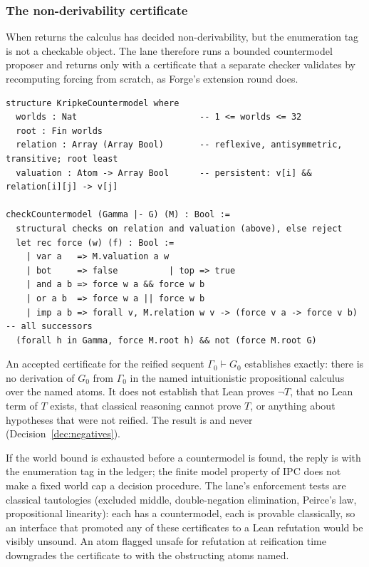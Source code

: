 \subsubsection{The non-derivability certificate}

When  returns  the calculus has decided non-derivability, but the enumeration tag is not a checkable object. The lane therefore runs a bounded countermodel proposer and returns  only with a certificate that a separate checker validates by recomputing forcing from scratch, as Forge's extension round does\cite{forge}.
\begin{lstlisting}
structure KripkeCountermodel where
  worlds : Nat                        -- 1 <= worlds <= 32
  root : Fin worlds
  relation : Array (Array Bool)       -- reflexive, antisymmetric, transitive; root least
  valuation : Atom -> Array Bool      -- persistent: v[i] && relation[i][j] -> v[j]

checkCountermodel (Gamma |- G) (M) : Bool :=
  structural checks on relation and valuation (above), else reject
  let rec force (w) (f) : Bool :=
    | var a   => M.valuation a w
    | bot     => false          | top => true
    | and a b => force w a && force w b
    | or a b  => force w a || force w b
    | imp a b => forall v, M.relation w v -> (force v a -> force v b)   -- all successors
  (forall h in Gamma, force M.root h) && not (force M.root G)
\end{lstlisting}

\begin{definition}
An accepted certificate for the reified sequent $\Gamma_0 \vdash G_0$ establishes exactly: there is no derivation of $G_0$ from $\Gamma_0$ in the named intuitionistic propositional calculus over the named atoms. It does not establish that Lean proves $\neg T$, that no Lean term of $T$ exists, that classical reasoning cannot prove $T$, or anything about hypotheses that were not reified. The result is  and never  (Decision~\ref{dec:negatives}).
\end{definition}

If the world bound is exhausted before a countermodel is found, the reply is  with the enumeration tag in the ledger; the finite model property of IPC does not make a fixed world cap a decision procedure\cite{forge}. The lane's enforcement tests are classical tautologies (excluded middle, double-negation elimination, Peirce's law, propositional linearity): each has a countermodel, each is provable classically, so an interface that promoted any of these certificates to a Lean refutation would be visibly unsound. An atom flagged unsafe for refutation at reification time downgrades the certificate to  with the obstructing atoms named.

